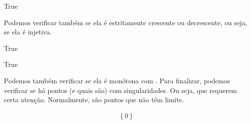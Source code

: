 \documentclass[letterpaper,10pt,english]{jupyterBook}
\begin{document}
\begin{sphinxVerbatim}[commandchars=\\\{\}]
True
\end{sphinxVerbatim}

\sphinxAtStartPar
Podemos verificar também se ela é estritamente crescente ou decrescente, ou seja, se ela é injetiva.

\begin{sphinxVerbatim}[commandchars=\\\{\}]
\end{sphinxVerbatim}

\begin{sphinxVerbatim}[commandchars=\\\{\}]
True
\end{sphinxVerbatim}

\begin{sphinxVerbatim}[commandchars=\\\{\}]
\end{sphinxVerbatim}

\begin{sphinxVerbatim}[commandchars=\\\{\}]
\end{sphinxVerbatim}

\begin{sphinxVerbatim}[commandchars=\\\{\}]
True
\end{sphinxVerbatim}

\sphinxAtStartPar
Podemos também verificar se ela é monótona com . Para finalizar, podemos verificar se há pontos (e quais são) com singularidades. Ou seja, que requerem certa atenção. Normalmente, são pontos que não têm limite.

\begin{sphinxVerbatim}[commandchars=\\\{\}]
\end{sphinxVerbatim}
\begin{equation*}
\begin{split}\displaystyle \left\{0\right\}\end{split}
\end{equation*}
\end{document}
